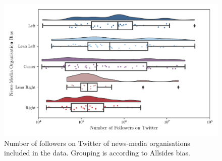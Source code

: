 \begin{figure}
	\centering
	\includegraphics[width=\textwidth]{chapter1/figs/number_of_follow_by_bias_raincloud}
	\caption{Number of followers on Twitter of news-media organisations included in the data. Grouping is according to Allsides bias.}
	\label{fig:data_number_of_follow_by_bias_raincloud}
\end{figure}


%
